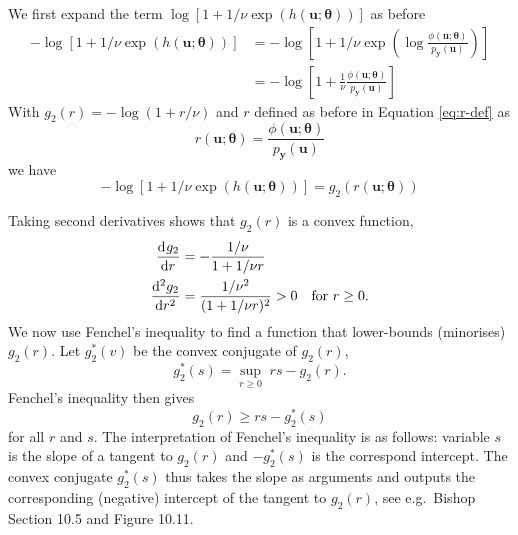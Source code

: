 \documentclass[11pt, oneside]{article}
\newcommand{\thetab}{{\boldsymbol{\theta}}}
\newcommand{\pnn}{\phi}
\newcommand{\pnoise}{p_{ \mathbf y}}
\renewcommand{\u}{{\mathbf u}}
\begin{document}
We first expand the term $ \log \left[1+1/\nu \exp(h(\u;\thetab))\right]$ as before
\begin{align}
  - \log [1+1/\nu \exp(h(\u;\thetab))] & =  - \log \left[1+1/\nu \exp \left( \log \frac{\pnn(\u;\thetab)}{\pnoise(\u)}\right) \right]\\
  & =  - \log \left[1+\frac{1}{\nu} \frac{\pnn(\u;\thetab)}{\pnoise(\u)}  \right] 
\end{align}
With $g_2(r) = -\log(1+r/\nu)$ and $r$ defined as before in Equation
\eqref{eq:r-def} as 
\begin{equation}
  r(\u;\thetab) = \frac{\pnn(\u;\thetab)}{\pnoise(\u)}
\end{equation}
we have
\begin{equation}
  - \log [1+1/\nu \exp(h(\u;\thetab))] = g_2(r(\u;\thetab))
\end{equation}

Taking second derivatives shows that $g_2(r)$ is a convex function,
\begin{align}
  \dod{g_2}{r} & = -\frac{1/\nu}{1+1/\nu r}\\
  \dod[2]{g_2}{r} & = \frac{1/\nu^2}{(1+1/\nu r)^2} >0 \quad \text{for } r\ge 0.
\end{align}
We now use Fenchel's inequality to find a function that lower-bounds (minorises) $g_2(r)$. Let $g_2^*(v)$ be the convex conjugate of $g_2(r)$,
\begin{equation}
  g_2^*(s) = \sup_{r\ge 0} \; rs - g_2(r).
\end{equation}
Fenchel's inequality then gives
\begin{equation}
  g_2(r) \ge r s - g_2^*(s)
\end{equation}
for all $r$ and $s$. The interpretation of Fenchel's inequality is as follows: variable $s$ is the slope of a tangent to $g_2(r)$ and $-g_2^*(s)$ is the correspond intercept. The convex conjugate $g_2^*(s)$ thus takes the slope as arguments and outputs the corresponding (negative) intercept of the tangent to $g_2(r)$, see e.g.\ Bishop Section 10.5 and Figure 10.11.
\end{document}
